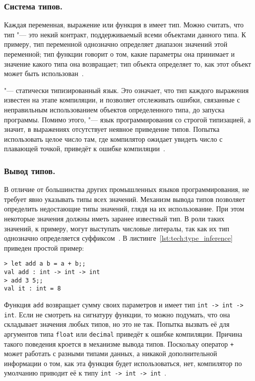 \subsubsection{Система типов. }
\label{ssub:tech:fsharp_types}
Каждая переменная, выражение или функция в \fsharp{} имеет тип. 
Можно считать, что тип "--- это некий контракт, поддерживаемый всеми объектами данного типа.
К примеру, тип переменной однозначно определяет диапазон значений этой переменной; тип функции говорит о том, какие параметры она принимает и значение какого типа она возвращает; тип объекта определяет то, как этот объект может быть использован~\cite{fsharp_pfp_issue_5}.

\fsharp{} "--- статически типизированный язык.
Это означает, что тип каждого выражения известен на этапе компиляции, и позволяет отслеживать ошибки, связанные с неправильным использованием объектов определенного типа, до запуска программы.
Помимо этого, \fsharp{} "--- язык программирования со строгой типизацией, а значит, в выражениях отсутствует неявное приведение типов.
Попытка использовать целое число там, где компилятор ожидает увидеть число с плавающей точкой, приведёт к ошибке компиляции~\cite{fsharp_pfp_issue_5}.

\subsubsection{Вывод типов. } 
\label{ssub:tech:fsharp_typeinference}
В отличие от большинства других промышленных языков программирования, \fsharp{} не требует явно указывать типы всех значений.
Механизм вывода типов позволяет определить недостающие типы значений, глядя на их использование.
При этом некоторые значения должны иметь заранее известный тип.
В роли таких значений, к примеру, могут выступать числовые литералы, так как их тип однозначно определяется суффиксом~\cite{fsharp_pfp_issue_5}. 
В листинге~\ref{lst:tech:type_inference} приведен простой пример:

\begin{lstlisting}[style=fsharpstyle,caption={Пример автоматического вывода типа функции}, label=lst:tech:type_inference]
> let add a b = a + b;;
val add : int -> int -> int
> add 3 5;;
val it : int = 8
\end{lstlisting}

Функция \lstinline!add! возвращает сумму своих параметров и имеет тип \lstinline!int -> int -> int!. 
Если не смотреть на сигнатуру функции, то можно подумать, что она складывает значения любых типов, но это не так. 
Попытка вызвать её для аргументов типа \lstinline!float! или \lstinline!decimal! приведёт к ошибке компиляции.
Причина такого поведения кроется в механизме вывода типов. 
Поскольку оператор \lstinline!+! может работать с разными типами данных, а никакой дополнительной информации о том, как эта функция будет использоваться, нет, компилятор по умолчанию приводит её к типу \lstinline!int -> int -> int!~\cite{fsharp_pfp_issue_5}.

